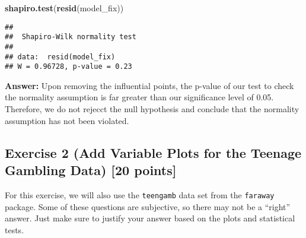 \documentclass[
]{article}
\newenvironment{Shaded}{\begin{snugshade}}{\end{snugshade}}
\newcommand{\FunctionTok}[1]{\textcolor[rgb]{0.13,0.29,0.53}{\textbf{#1}}}
\newcommand{\NormalTok}[1]{#1}
\begin{document}
\begin{enumerate}
\begin{Shaded}
\begin{Highlighting}[]
\FunctionTok{shapiro.test}\NormalTok{(}\FunctionTok{resid}\NormalTok{(model\_fix))}
\end{Highlighting}
\end{Shaded}

\begin{verbatim}
## 
##  Shapiro-Wilk normality test
## 
## data:  resid(model_fix)
## W = 0.96728, p-value = 0.23
\end{verbatim}

  \textbf{Answer:} Upon removing the influential points, the p-value of
  our test to check the normality assumption is far greater than our
  significance level of 0.05. Therefore, we do not rejecct the null
  hypothesis and conclude that the normality assumption has not been
  violated.
\end{enumerate}

\hypertarget{exercise-2-add-variable-plots-for-the-teenage-gambling-data-20-points}{%
\subsection{Exercise 2 (Add Variable Plots for the Teenage Gambling
Data) {[}20
points{]}}\label{exercise-2-add-variable-plots-for-the-teenage-gambling-data-20-points}}

For this exercise, we will also use the \texttt{teengamb} data set from
the \texttt{faraway} package. Some of these questions are subjective, so
there may not be a ``right'' answer. Just make sure to justify your
answer based on the plots and statistical tests.
\end{document}
